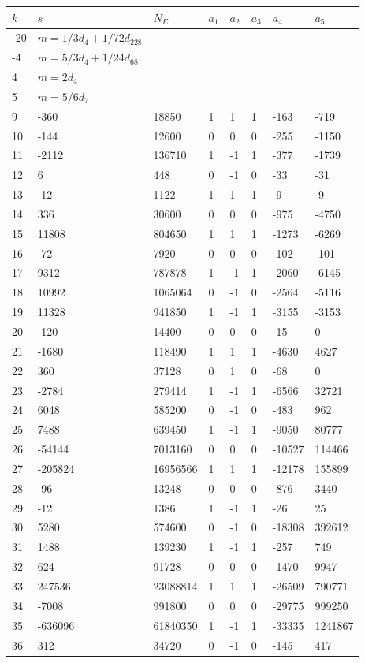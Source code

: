 \documentclass{amsart}
\begin{document}
\begin{longtable}{|l|l|l|lllll|}
\hline
$k$ & $s$ & $N_E$ & $a_1$ & $a_2$ & $a_3$ & $a_4$ & $a_5$\\
\hline
-20&$m=1/3d_{4}+1/72d_{228}$&&\multicolumn{5}{c|}{}\\
-4&$m=5/3d_{4}+1/24d_{68}$&&\multicolumn{5}{c|}{}\\
4&$m=2d_{4}$&&\multicolumn{5}{c|}{}\\
5&$m=5/6d_{7}$&&\multicolumn{5}{c|}{}\\
9&-360&18850&1&1&1&-163&-719\\
10&-144&12600&0&0&0&-255&-1150\\
11&-2112&136710&1&-1&1&-377&-1739\\
12&6&448&0&-1&0&-33&-31\\
13&-12&1122&1&1&1&-9&-9\\
14&336&30600&0&0&0&-975&-4750\\
15&11808&804650&1&1&1&-1273&-6269\\
16&-72&7920&0&0&0&-102&-101\\
17&9312&787878&1&-1&1&-2060&-6145\\
18&10992&1065064&0&-1&0&-2564&-5116\\
19&11328&941850&1&-1&1&-3155&-3153\\
20&-120&14400&0&0&0&-15&0\\
21&-1680&118490&1&1&1&-4630&4627\\
22&360&37128&0&1&0&-68&0\\
23&-2784&279414&1&-1&1&-6566&32721\\
24&6048&585200&0&-1&0&-483&962\\
25&7488&639450&1&-1&1&-9050&80777\\
26&-54144&7013160&0&0&0&-10527&114466\\
27&-205824&16956566&1&1&1&-12178&155899\\
28&-96&13248&0&0&0&-876&3440\\
29&-12&1386&1&-1&1&-26&25\\
30&5280&574600&0&-1&0&-18308&392612\\
31&1488&139230&1&-1&1&-257&749\\
32&624&91728&0&0&0&-1470&9947\\
33&247536&23088814&1&1&1&-26509&790771\\
34&-7008&991800&0&0&0&-29775&999250\\
35&-636096&61840350&1&-1&1&-33335&1241867\\
36&312&34720&0&-1&0&-145&417\\

\end{longtable}
\end{document}
